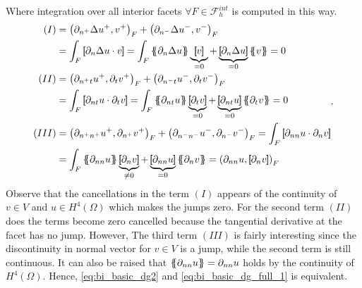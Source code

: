 Where integration over all interior facets $ \forall F \in \mathcal{F}_{h}^{int}$ is computed in this way.
\begin{equation*}
    \begin{split}
        (I) &  =    \left(\partial _{n^{+}} \Delta  u^{+} ,v^{+}\right)_{F} +
        \left(\partial _{n^{-}} \Delta  u^{-} ,v^{-}\right)_{F}  \\
        & =   \int_{F}^{}
        \jump{ \partial _{n} \Delta  u \cdot v } =
         \int_{F}^{}
         \mean{ \partial _{n} \Delta  u } \underbrace{\jump{ v }}_{= 0}    + \underbrace{\jump{ \partial _{n} \Delta  u
         }}_{= 0}    \mean{ v } = 0 \\
        (II) &  =     \left(\partial _{n^{+}t} u^{+}, \partial_{t} v^{+}
        \right)_{F} +  \left(\partial _{n^{-}t} u^{-}, \partial_{t} v^{-}
\right)_{F}   \\
&  =   \int_{F}^{}
        \jump{ \partial _{nt} u \cdot  \partial_{t} v } =
         \int_{F}^{}
         \mean{ \partial _{nt} u    } \underbrace{\jump{ \partial_{t} v }  }_{= 0}    + \underbrace{\jump{ \partial
                 _{nt}  u
         }}_{= 0}    \mean{ \partial _{t}v }  = 0\\
        (III) &  =     \left(\partial _{n^{+}n^{+}} u^{+}, \partial_{n^{+}} v^{+} \right)_{F} +  \left(\partial _{n^{-}n^{-}} u^{-}, \partial_{n^{-}} v^{-} \right)_{F}    =    \int_{F}^{} \jump{ \partial _{nn} u \cdot  \partial_{n} v }  \\
        & = \int_{F}^{}
        \mean{ \partial _{nn} u    } \underbrace{\jump{ \partial_{n} v }  }_{\neq 0}    + \underbrace{\jump{ \partial
                 _{nn}  u
         }}_{= 0}    \mean{ \partial _{n}v }   =  \left( \partial _{nn} u, \jump{ \partial_{n} v } \right)_{F}   \end{split}
.\end{equation*}
Observe that the cancellations in the term $(I)$ appears of the continuity of $v\in V $ and $u\in H^{4}\left( \Omega  \right) $ which makes the jumps zero. For the second term $(II)$ does the terms become zero cancelled because the tangential
derivative at the facet has no jump. However, The third term $(III)$  is fairly interesting since the discontinuity in
normal vector for $v \in V$ is a jump, while the second term is still continuous. It can also be raised that $\left\{\!\!\left\{
\partial _{nn} u \right\}\!\!\right\} = \partial _{nn} u  $ holds by the continuity of $H^{4}\left( \Omega  \right) $. Hence,
\eqref{eq:bi_basic_dg2} and \eqref{eq:bi_basic_dg_full_1} is equivalent.

